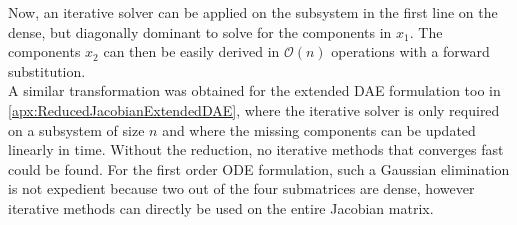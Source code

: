 Now, an iterative solver can be applied on the subsystem in the first line on the dense, but diagonally dominant to solve for the components in $x_1$. The components $x_2$ can then be easily derived in $\mathcal{O}(n)$ operations with a forward substitution. \\
A similar transformation was obtained for the extended DAE formulation too in \autoref{apx:ReducedJacobianExtendedDAE}, where the iterative solver is only required on a subsystem of size $n$ and where the missing components can be updated linearly in time. Without the reduction, no iterative methods that converges fast could be found. For the first order ODE formulation, such a Gaussian elimination is not expedient because two out of the four submatrices are dense, however iterative methods can directly be used on the entire Jacobian matrix.


